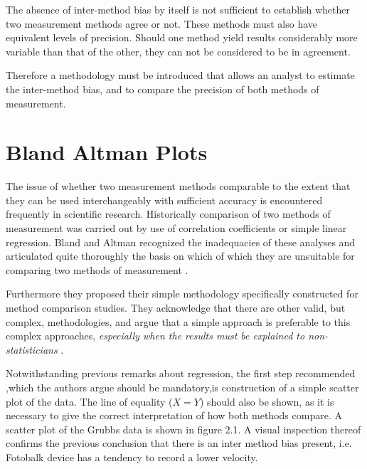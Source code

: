 \documentclass{report}
\begin{document}
\noindent The absence of inter-method bias by itself is not
sufficient to establish whether two measurement methods agree or
not. These methods must also have equivalent levels of precision.
Should one method yield results considerably more variable than
that of the other, they can not be considered to be in agreement.

Therefore a methodology must be introduced that allows an analyst
to estimate the inter-method bias, and to compare the precision of
both methods of measurement.
\newpage
\section{Bland Altman Plots}
The issue of whether two measurement methods comparable to the
extent that they can be used interchangeably with sufficient
accuracy is encountered frequently in scientific research.
Historically comparison of two methods of measurement was carried
out by use of correlation coefficients or simple linear
regression. Bland and Altman recognized the inadequacies of these
analyses and articulated quite thoroughly the basis on which of
which they are unsuitable for comparing two methods of measurement
\citep*{BA83}.


Furthermore they proposed their simple methodology specifically
constructed for method comparison studies. They acknowledge that
there are other valid, but complex, methodologies, and argue that
a simple approach is preferable to this complex approaches,
\emph{especially when the results must be explained to
	non-statisticians} \citep*{BA83}.

\smallskip

Notwithstanding previous remarks about regression, the first step
recommended ,which the authors argue should be mandatory,is
construction of a simple scatter plot of the data. The line of
equality ($X=Y$) should also be shown, as it is necessary to give
the correct interpretation of how both methods compare. A scatter
plot of the Grubbs data is shown in figure 2.1. A visual
inspection thereof confirms the previous conclusion that there is
an inter method bias present, i.e. Fotobalk device has a tendency
to record a lower velocity.

\end{document}
